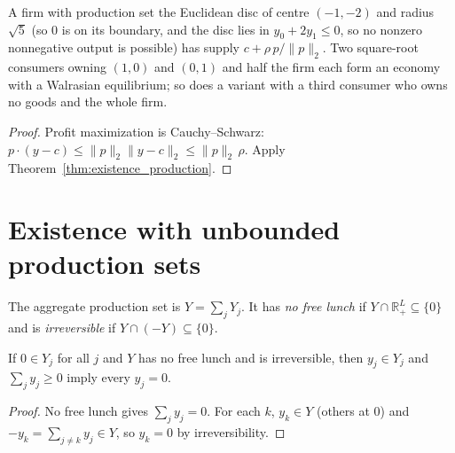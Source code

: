 \begin{theorem}
\label{thm:disc_economy}
\leanok
{}
A firm with production set the Euclidean disc of centre $(-1, -2)$ and radius $\sqrt5$ (so $0$ is on its boundary, and
the disc lies in $y_0 + 2y_1 \le 0$, so no nonzero nonnegative output is possible) has supply $c + \rho\, p/\|p\|_2$. Two square-root consumers owning $(1,0)$ and $(0,1)$ and half the firm each
form an economy with a Walrasian equilibrium; so does a variant with a third consumer who owns no goods and the whole
firm.
\end{theorem}
\begin{proof}
\leanok
Profit maximization is Cauchy--Schwarz: $p\cdot(y - c) \le \|p\|_2 \|y - c\|_2 \le \|p\|_2\,\rho$. Apply
Theorem~\ref{thm:existence_production}.
\end{proof}

\section{Existence with unbounded production sets}
\label{sec:existence_unbounded}

The aggregate production set is $Y = \sum_j Y_j$. It has \emph{no free lunch} if $Y \cap \mathbb{R}^L_+ \subseteq \{0\}$
and is \emph{irreversible} if $Y \cap (-Y) \subseteq \{0\}$.

\begin{lemma}
\label{lem:eq_zero_of_sum_nonneg}
\leanok
If $0 \in Y_j$ for all $j$ and $Y$ has no free lunch and is irreversible, then $y_j \in Y_j$ and $\sum_j y_j \ge 0$
imply every $y_j = 0$.
\end{lemma}
\begin{proof}
\leanok
No free lunch gives $\sum_j y_j = 0$. For each $k$, $y_k \in Y$ (others at $0$) and $-y_k = \sum_{j \ne k} y_j \in Y$, so
$y_k = 0$ by irreversibility.
\end{proof}

